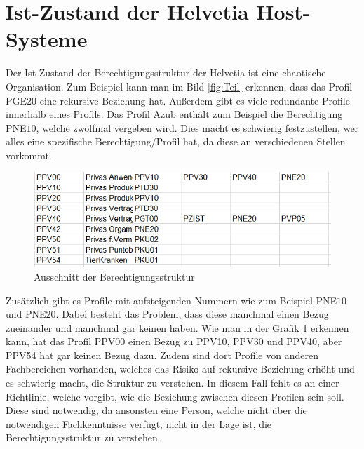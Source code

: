 \section{Ist-Zustand der Helvetia Host-Systeme}
\label{sec:chapter03:Ist-Zustand}
Der Ist-Zustand der Berechtigungsstruktur der Helvetia ist eine chaotische Organisation.
Zum Beispiel kann man im Bild \ref{fig:Teil} erkennen, dass das Profil PGE$20$ eine rekursive Beziehung hat.
Außerdem gibt es viele redundante Profile innerhalb eines Profils.
Das Profil Azub enthält zum Beispiel die Berechtigung PNE$10$, welche zwölfmal vergeben wird.
Dies macht es schwierig festzustellen, wer alles eine spezifische Berechtigung/Profil hat, da diese an verschiedenen Stellen vorkommt.
\begin{figure}[h!]
 \centering
 \includegraphics[width=1\textwidth]{gfx/Picture/Beispiel.PNG}
 \caption{Ausschnitt der Berechtigungsstruktur}
 \label{fig:Profile}
\end{figure}
Zusätzlich gibt es Profile mit aufsteigenden Nummern wie zum Beispiel PNE$10$ und PNE$20$.
Dabei besteht das Problem, dass diese manchmal einen Bezug zueinander und manchmal gar keinen haben.
Wie man in der Grafik \ref{fig:Profile} erkennen kann, hat das Profil PPV00 einen Bezug zu PPV10, PPV30 und PPV40, aber PPV54 hat gar keinen Bezug dazu.
Zudem sind dort Profile von anderen Fachbereichen vorhanden, welches das Risiko auf rekursive Beziehung erhöht und es schwierig macht, die Struktur zu verstehen.
In diesem Fall fehlt es an einer Richtlinie, welche vorgibt, wie die Beziehung zwischen diesen Profilen sein soll.
Diese sind notwendig, da ansonsten eine Person, welche nicht über die notwendigen Fachkenntnisse verfügt, nicht in der Lage ist, die Berechtigungsstruktur zu verstehen.